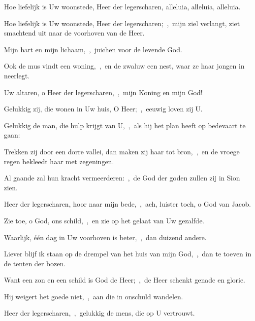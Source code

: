 \documentclass[12pt,twoside,a5paper]{article}
\begin{document}

\begin{halfparskip}
  Hoe liefelijk is Uw woonstede, Heer der legerscharen, alleluia, alleluia, alleluia.

  Hoe liefelijk is Uw woonstede, Heer der legerscharen;~\sep\ mijn ziel verlangt, ziet smachtend uit naar de voorhoven van de Heer.

  Mijn hart en mijn lichaam,~\sep\ juichen voor de levende God.

  Ook de mus vindt een woning,~\sep\ en de zwaluw een nest, waar ze haar jongen in neerlegt.

  Uw altaren, o Heer der legerscharen,~\sep\ mijn Koning en mijn God!

  Gelukkig zij, die wonen in Uw huis, O Heer;~\sep\ eeuwig loven zij U.

  Gelukkig de man, die hulp krijgt van U,~\sep\ als hij het plan heeft op bedevaart te gaan:

  Trekken zij door een dorre vallei, dan maken zij haar tot bron,~\sep\ en de vroege regen bekleedt haar met zegeningen.

  Al gaande zal hun kracht vermeerderen:~\sep\ de God der goden zullen zij in Sion zien.

  Heer der legerscharen, hoor naar mijn bede,~\sep\ ach, luister toch, o God van Jacob.

  Zie toe, o God, ons schild,~\sep\ en zie op het gelaat van Uw gezalfde.

  Waarlijk, één dag in Uw voorhoven is beter,~\sep\ dan duizend andere.

  Liever blijf ik staan op de drempel van het huis van mijn God,~\sep\ dan te toeven in de tenten der bozen.

  Want een zon en een schild is God de Heer;~\sep\ de Heer schenkt genade en glorie.

  Hij weigert het goede niet,~\sep\ aan die in onschuld wandelen.

  Heer der legerscharen,~\sep\ gelukkig de mens, die op U vertrouwt.
\end{halfparskip}

\end{document}
